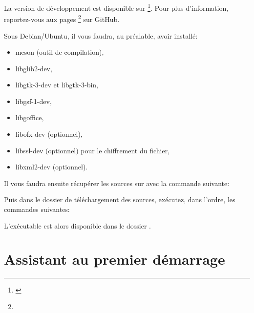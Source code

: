 La version de développement est disponible sur \footnote{\label{fn:github}\urlGitHubGrisbi}. %
Pour plus d'information, reportez-vous aux pages \footnote{\urlGitHubGrisbiWiki} sur GitHub.

Sous Debian/Ubuntu, il vous faudra, au préalable, avoir installé:
\begin{itemize}
	\item meson (outil de compilation),
	\item libglib2-dev,
	\item libgtk-3-dev et libgtk-3-bin,
	\item libgsf-1-dev,
	\item libgoffice,
	\item libofx-dev (optionnel),
	\item libssl-dev (optionnel) pour le chiffrement du fichier,
	\item libxml2-dev (optionnel).
\end{itemize}

Il vous faudra ensuite récupérer les sources sur  avec la commande suivante:


Puis dans le dossier de téléchargement des sources, exécutez, dans l'ordre, les commandes suivantes:

\setlength{\parindent}{20pt}
\par
\par
{}

L'exécutable est alors disponible dans le dossier .


\section{Assistant au premier démarrage\label{start-first}}


